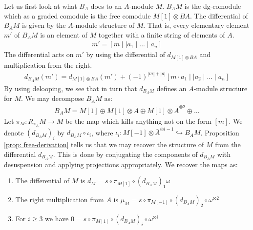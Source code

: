 \documentclass[../thesis.tex]{subfiles}
\begin{document}
            Let us first look at what $B_A$ does to an $A$-module $M$. $B_AM$ is the dg-comodule which as a graded comodule is the free comodule $M[1] \otimes BA$. The differential of $B_AM$ is given by the $A$-module structure of $M$. That is, every elementary element $m'$ of $B_AM$ is an element of $M$ together with a finite string of elements of $A$.
            \begin{align*}
                m' = [ m \mid\mid a_1 \mid ... \mid a_n]
            \end{align*}
            The differential acts on $m'$ by using the differential of $d_{M[1]\otimes BA}$ and multiplication from the right.
            \begin{align*}
                d_{B_AM}(m') = d_{M[1]\otimes BA}(m') + (-1)^{|m|+|a|} [m\cdot a_1 \mid\mid a_2 \mid ... \mid a_n]
            \end{align*}
            By using delooping, we see that in turn that $d_{B_AM}$ defines an $A$-module structure for $M$. We may decompose $B_AM$ as:
            \begin{align*}
                B_AM = M[1] \oplus M[1] \otimes \bar{A} \oplus M[1] \otimes \bar{A}^{\otimes 2} \oplus ...
            \end{align*}
            Let $\pi_M : R_{\pi_A}M \rightarrow M$ be the map which kills anything not on the form $[m]$. We denote $(d_{B_AM})_i$ by $d_{B_AM} \circ \iota_i$, where $\iota_i : M[-1] \otimes \bar{A}^{\otimes i-1} \hookrightarrow B_AM$. Proposition \ref{prop: free-derivation} tells us that we may recover the structure of $M$ from the differential $d_{B_AM}$. This is done by conjugating the components of $d_{B_AM}$ with desuspension and applying projections appropriately. We recover the maps as:
            \begin{enumerate}
                \item The differential of $M$ is $d_M = s \circ \pi_{M[1]} \circ (d_{B_AM})_1 \omega$
                \item The right multiplication from $A$ is $\mu_M = s\circ \pi_{M[-1]} \circ (d_{B_AM})_2 \circ \omega^{\otimes 2}$
                \item For $i \geq 3$ we have $0 = s \circ \pi_{M[1]} \circ (d_{B_AM})_i \circ \omega^{\otimes i}$
            \end{enumerate}
\end{document}
